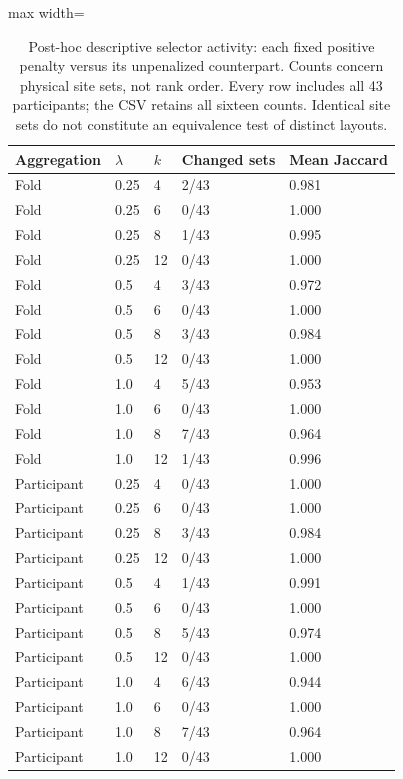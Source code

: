 \begin{table}[htbp]
\centering\small
\caption{Post-hoc descriptive selector activity: each fixed positive penalty versus its unpenalized counterpart. Counts concern physical site sets, not rank order. Every row includes all 43 participants; the CSV retains all sixteen counts. Identical site sets do not constitute an equivalence test of distinct layouts.}\label{tab:selectionchanges}
\begin{adjustbox}{max width=\textwidth}
\begin{tabular}{lllll}\toprule
Aggregation & $\lambda$ & $k$ & Changed sets & Mean Jaccard\\\midrule
Fold & 0.25 & 4 & 2/43 & 0.981\\
Fold & 0.25 & 6 & 0/43 & 1.000\\
Fold & 0.25 & 8 & 1/43 & 0.995\\
Fold & 0.25 & 12 & 0/43 & 1.000\\
Fold & 0.5 & 4 & 3/43 & 0.972\\
Fold & 0.5 & 6 & 0/43 & 1.000\\
Fold & 0.5 & 8 & 3/43 & 0.984\\
Fold & 0.5 & 12 & 0/43 & 1.000\\
Fold & 1.0 & 4 & 5/43 & 0.953\\
Fold & 1.0 & 6 & 0/43 & 1.000\\
Fold & 1.0 & 8 & 7/43 & 0.964\\
Fold & 1.0 & 12 & 1/43 & 0.996\\
Participant & 0.25 & 4 & 0/43 & 1.000\\
Participant & 0.25 & 6 & 0/43 & 1.000\\
Participant & 0.25 & 8 & 3/43 & 0.984\\
Participant & 0.25 & 12 & 0/43 & 1.000\\
Participant & 0.5 & 4 & 1/43 & 0.991\\
Participant & 0.5 & 6 & 0/43 & 1.000\\
Participant & 0.5 & 8 & 5/43 & 0.974\\
Participant & 0.5 & 12 & 0/43 & 1.000\\
Participant & 1.0 & 4 & 6/43 & 0.944\\
Participant & 1.0 & 6 & 0/43 & 1.000\\
Participant & 1.0 & 8 & 7/43 & 0.964\\
Participant & 1.0 & 12 & 0/43 & 1.000\\
\bottomrule\end{tabular}
\end{adjustbox}
\end{table}
